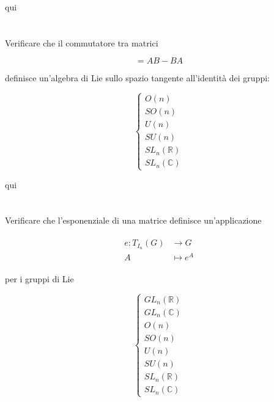 qui

\section{}\label{es3-9}

\begin{tcolorbox}
	Verificare che il commutatore tra matrici
	
	\begin{equation}
		[A,B] = AB - BA
	\end{equation}

	definisce un'algebra di Lie sullo spazio tangente all'identità dei gruppi:
	
	\begin{equation}
		\begin{cases}
			O(n)\\
			SO(n)\\
			U(n)\\
			SU(n)\\
			SL_{n}(\mathbb{R})\\
			SL_{n}(\mathbb{C})
		\end{cases}
	\end{equation}
\end{tcolorbox}

qui

\section{}\label{es3-10}

\begin{tcolorbox}
	Verificare che l'esponenziale di una matrice definisce un'applicazione
	
	\begin{align}
		\begin{split}
			e : T_{I_{n}}(G) &\to G\\
			A &\mapsto e^{A}
		\end{split}
	\end{align}

	per i gruppi di Lie
	
	\begin{equation}
		\begin{cases}
			GL_{n}(\mathbb{R})\\
			GL_{n}(\mathbb{C})\\
			O(n)\\
			SO(n)\\
			U(n)\\
			SU(n)\\
			SL_{n}(\mathbb{R})\\
			SL_{n}(\mathbb{C})
		\end{cases}
	\end{equation}
\end{tcolorbox}

